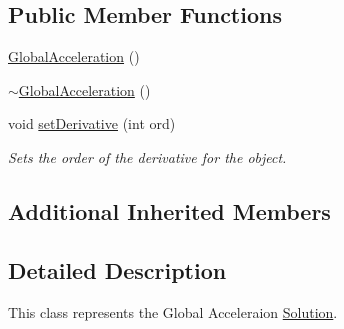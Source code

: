 \subsection*{Public Member Functions}
\begin{DoxyCompactItemize}
\item 
\hyperlink{classosea_1_1ofreq_1_1_global_acceleration_a37a05fcecd06641847388428a3f43fb8}{Global\-Acceleration} ()
\item 
\hyperlink{classosea_1_1ofreq_1_1_global_acceleration_aafb7853a1923f0e06b96f2ef4eca03d3}{$\sim$\-Global\-Acceleration} ()
\item 
void \hyperlink{classosea_1_1ofreq_1_1_global_acceleration_a14a041ea42d4c1bc10211c9a44aa3431}{set\-Derivative} (int ord)
\begin{DoxyCompactList}\small\item\em Sets the order of the derivative for the object. \end{DoxyCompactList}\end{DoxyCompactItemize}
\subsection*{Additional Inherited Members}


\subsection{Detailed Description}
This class represents the Global Acceleraion \hyperlink{classosea_1_1ofreq_1_1_solution}{Solution}. 

